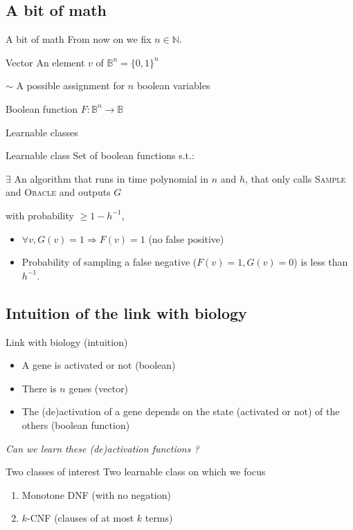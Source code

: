 \documentclass{beamer}
\begin{document}
\subsection{A bit of math}
\begin{frame}{A bit of math}
	From now on we fix $n \in \mathbb{N}$.
	\begin{block}{Vector}
	An element $v$ of $\mathbb{B}^n = \{0,1\}^n$
	\vspace{1em}
	
	$\sim$ A possible assignment for $n$ boolean variables
	\end{block}
\begin{block}{Boolean function}
	$F : \mathbb{B}^n \longrightarrow \mathbb{B}$
\end{block}
\end{frame}
\begin{frame}{Learnable classes}
\begin{block}{Learnable class}
		Set of boolean functions s.t.:
		\vspace{1em}
		
		$\exists$ An algorithm that runs in time polynomial in $n$ and $h$, that only calls \textsc{Sample} and \textsc{Oracle}
		\vspace{1em} and outputs $G$ 
		
		with probability $\geq 1 - h^{-1}$, 
		\begin{itemize}
			\item $\forall v, G(v) = 1 \Rightarrow F(v) = 1$ (no false positive)
			\item Probability of sampling a false negative ($F(v) = 1, G(v)=0$) is less than $h^{-1}$.
		\end{itemize}
\end{block}
\end{frame}
\subsection{Intuition of the link with biology}
\begin{frame}{Link with biology (intuition)}
	\begin{itemize}
		\item A gene is activated or not (boolean)
		\item There is $n$ genes  (vector)
		\item The (de)activation of a gene depends on the state (activated or not) of the others (boolean function)
	\end{itemize}
\centering
\slshape
Can we learn these (de)activation functions ?
\end{frame}
\begin{frame}{Two classes of interest}
Two learnable class on which we focus
\begin{enumerate}
	\item Monotone DNF (with no negation)
	\item $k$-CNF (clauses of at most $k$ terms)
\end{enumerate}
\end{frame}
\end{document}
